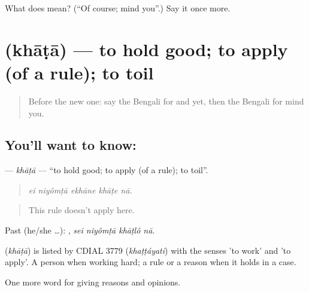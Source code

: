 \begin{tcolorbox}[breakable,colback=teal!4,colframe=teal!35!black,title={Before you move on}]
What does  mean? (\textquotedblleft{}Of course; mind you\textquotedblright{}.) Say it once more.
\end{tcolorbox}
\section[\texorpdfstring{\bn{খাটা} (khāṭā)}{খাটা (khāṭā)}]{ (khāṭā) — to hold good; to apply (of a rule); to toil}

\label{lesson:BN-C332-khata}



\begin{quote}
Before the new one: say the Bengali for and yet, then the Bengali for mind you.
\end{quote}

\subsection*{You'll want to know: }
\textbf{} — \emph{khāṭā} — \textquotedblleft{}to hold good; to apply (of a rule); to toil\textquotedblright{}.

\begin{quote}
    
\end{quote}

\begin{quote}
\emph{ei niyômṭā ekhāne khāṭe nā.}
\end{quote}

\begin{quote}
This rule doesn't apply here.
\end{quote}

Past (he/she …):    , \emph{sei niyômṭā khāṭlô nā}.

\begin{cousinweb}
\textbf{} (\emph{khāṭā}) is listed by CDIAL 3779 (\emph{khaṭṭáyati}) with the senses 'to work' and 'to apply'. A person  when working hard; a rule or a reason  when it holds in a case.
\end{cousinweb}

\begin{grammarlens}[title={What you've built}]
One more word for giving reasons and opinions.
\end{grammarlens}

